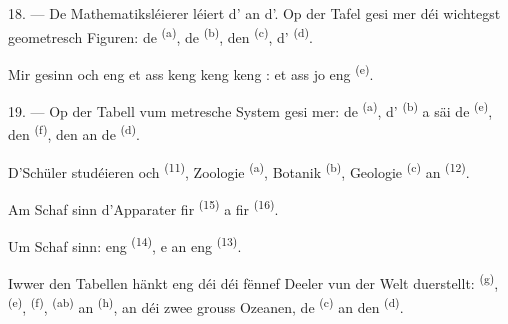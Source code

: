 \VUsaut{5.0mm}
\VUsaut{3.6mm}

18. --- De Mathematiksléierer léiert d'  an d'. Op der Tafel gesi mer déi wichtegst
geometresch Figuren: de  \textsuperscript{(a)}, de 
\textsuperscript{(b)}, den  \textsuperscript{(c)}, d'
\textsuperscript{(d)}.

Mir gesinn och eng  et ass keng  keng
 keng : et ass jo eng
 \textsuperscript{(e)}.

19. --- Op der Tabell vum metresche System gesi mer: de 
\textsuperscript{(a)}, d' \textsuperscript{(b)} a säi  de
 \textsuperscript{(e)}, den  \textsuperscript{(f)},
den  an de  \textsuperscript{(d)}.

D'Schüler studéieren och  \textsuperscript{(11)}, Zoologie
\textsuperscript{(a)}, Botanik \textsuperscript{(b)}, Geologie \textsuperscript{(c)}
an  \textsuperscript{(12)}.

Am Schaf sinn d'Apparater fir  \textsuperscript{(15)} a fir
 \textsuperscript{(16)}.

Um Schaf sinn: eng  \textsuperscript{(14)}, e  an eng
 \textsuperscript{(13)}.

Iwwer den Tabellen hänkt eng  déi déi fënnef Deeler vun der Welt
duerstellt:  \textsuperscript{(g)}, 
\textsuperscript{(e)},  \textsuperscript{(f)}, 
\textsuperscript{(ab)} an  \textsuperscript{(h)}, an déi zwee grouss
Ozeanen, de  \textsuperscript{(c)} an den 
\textsuperscript{(d)}.
\VUsaut{6.0mm}
\VUfilet{22mm}
